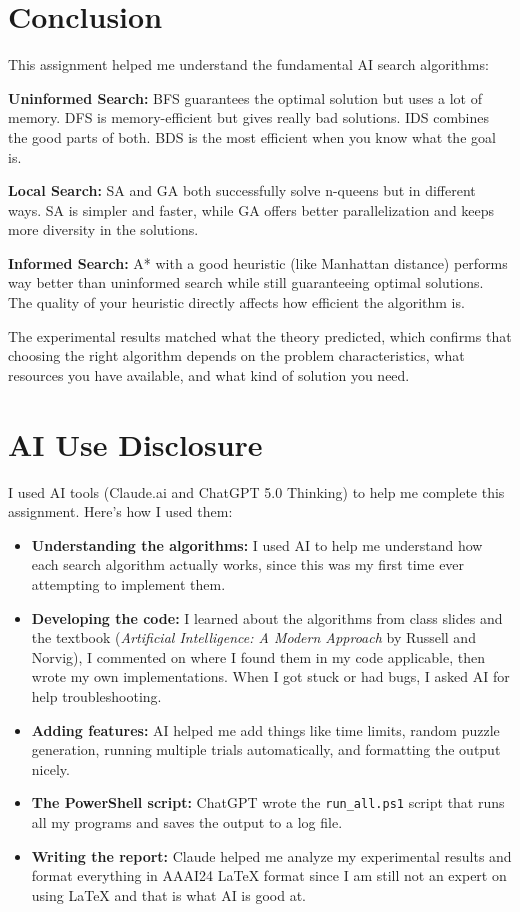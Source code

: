\documentclass[letterpaper]{article}
\begin{document}
\section{Conclusion}

This assignment helped me understand the fundamental AI search algorithms:

\textbf{Uninformed Search:} BFS guarantees the optimal solution but uses a lot of memory. DFS is memory-efficient but gives really bad solutions. IDS combines the good parts of both. BDS is the most efficient when you know what the goal is.

\textbf{Local Search:} SA and GA both successfully solve n-queens but in different ways. SA is simpler and faster, while GA offers better parallelization and keeps more diversity in the solutions.

\textbf{Informed Search:} A* with a good heuristic (like Manhattan distance) performs way better than uninformed search while still guaranteeing optimal solutions. The quality of your heuristic directly affects how efficient the algorithm is.

The experimental results matched what the theory predicted, which confirms that choosing the right algorithm depends on the problem characteristics, what resources you have available, and what kind of solution you need.

\section*{AI Use Disclosure}

I used AI tools (Claude.ai and ChatGPT 5.0 Thinking) to help me complete this assignment. Here's how I used them:

\begin{itemize}
    \item \textbf{Understanding the algorithms:} I used AI to help me understand how each search algorithm actually works, since this was my first time ever attempting to implement them.
    \item \textbf{Developing the code:} I learned about the algorithms from class slides and the textbook (\textit{Artificial Intelligence: A Modern Approach} by Russell and Norvig), I commented on where I found them in my code applicable, then wrote my own implementations. When I got stuck or had bugs, I asked AI for help troubleshooting.
    \item \textbf{Adding features:} AI helped me add things like time limits, random puzzle generation, running multiple trials automatically, and formatting the output nicely.
    \item \textbf{The PowerShell script:} ChatGPT wrote the \texttt{run\_all.ps1} script that runs all my programs and saves the output to a log file.
    \item \textbf{Writing the report:} Claude helped me analyze my experimental results and format everything in AAAI24 LaTeX format since I am still not an expert on using LaTeX and that is what AI is good at.
\end{itemize}
\end{document}
